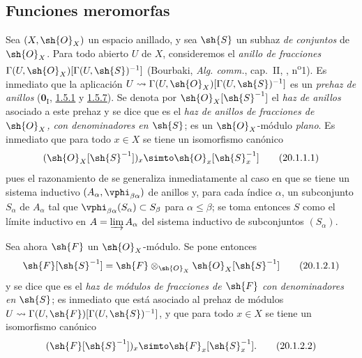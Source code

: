 \subsection{Funciones meromorfas}
\label{IV.20.1}

\begin{env}[20.1.1]
\label{IV.20.1.1}
Sea $(X,\sh{O}_X)$ un espacio anillado, y sea $\sh{S}$ un subhaz \emph{de conjuntos} de $\sh{O}_X$.
Para todo abierto $U$ de $X$, consideremos el \emph{anillo de fracciones} $\Gamma(U,\sh{O}_X)[\Gamma(U,\sh{S})^{-1}]$ (Bourbaki, \emph{Alg. comm.}, cap.~II, , n\textsuperscript{o}1).
Es inmediato que la aplicación $U\leadsto\Gamma(U,\sh{O}_X)[\Gamma(U,\sh{S})^{-1}]$ es un \emph{prehaz de anillos} ($\mathbf{0}_{\mathrm I}$, \hyperref[0.1.5.1]{1.5.1} y \hyperref[0.1.5.7]{1.5.7}).
Se denota por $\sh{O}_X[\sh{S}^{-1}]$ el \emph{haz de anillos} asociado a este prehaz y se dice que es el \emph{haz de anillos de fracciones de $\sh{O}_X$, con denominadores en $\sh{S}$}; es un $\sh{O}_X$-módulo \emph{plano}.
Es inmediato que para todo $x\in X$ se tiene un isomorfismo canónico
\[
\label{IV.20.1.1.1}
  (\sh{O}_X[\sh{S}^{-1}])_x\simto\sh{O}_x[\sh{S}_x^{-1}]
  \tag{20.1.1.1}
\]
pues el razonamiento de  se generaliza inmediatamente al caso en que se tiene un sistema inductivo $(A_\alpha,\vphi_{\beta\alpha})$ de anillos y, para cada índice $\alpha$, un subconjunto $S_\alpha$ de $A_\alpha$ tal que
$\vphi_{\beta\alpha}(S_\alpha)\subset S_\beta$ para $\alpha\leq\beta$; se toma entonces $S$ como el límite inductivo en $A=\varinjlim A_\alpha$ del sistema inductivo de subconjuntos $(S_\alpha)$.
\end{env}

\begin{env}[20.1.2]
\label{IV.20.1.2}
Sea ahora $\sh{F}$ un $\sh{O}_X$-módulo.
Se pone entonces
\[
\label{IV.20.1.2.1}
  \sh{F}[\sh{S}^{-1}]=\sh{F}\otimes_{\sh{O}_X}\sh{O}_X[\sh{S}^{-1}]
  \tag{20.1.2.1}
\]
y se dice que es el \emph{haz de módulos de fracciones de $\sh{F}$ con denominadores en $\sh{S}$}; es inmediato que está asociado al prehaz de módulos $U\leadsto\Gamma(U,\sh{F})[\Gamma(U,\sh{S})^{-1}]$, y que para todo $x\in X$ se tiene un isomorfismo canónico
\[
\label{IV.20.1.2.2}
  (\sh{F}[\sh{S}^{-1}])_x\simto\sh{F}_x[\sh{S}_x^{-1}].
  \tag{20.1.2.2}
\]
\end{env}

